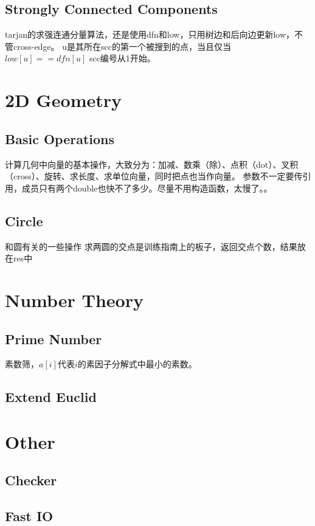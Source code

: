 \documentclass[twoside, UTF8]{article}
\begin{document}
		\subsection{Strongly Connected Components}
			\begin{flushleft}
				tarjan的求强连通分量算法，还是使用dfn和low，只用树边和后向边更新low，不管cross-edge。
				\linebreak u是其所在scc的第一个被搜到的点，当且仅当$low[u] == dfn[u]$
				\linebreak scc编号从1开始。
			\end{flushleft}
			
	\newpage
	\section{2D Geometry}
		\subsection{Basic Operations}
			\begin{flushleft}
				计算几何中向量的基本操作，大致分为：加减、数乘（除）、点积（dot）、叉积（cross）、旋转、求长度、求单位向量，同时把点也当作向量。
				\linebreak 参数不一定要传引用，成员只有两个double也快不了多少。尽量不用构造函数，太慢了。。
			\end{flushleft}
			
		\subsection{Circle}
			\begin{flushleft}
				和圆有关的一些操作
				\linebreak 求两圆的交点是训练指南上的板子，返回交点个数，结果放在res中
			\end{flushleft}
			
	\newpage
	\section{Number Theory}
		\subsection{Prime Number}
			\begin{flushleft}
				素数筛，$a[i]$代表$i$的素因子分解式中最小的素数。
			\end{flushleft}
			
		\subsection{Extend Euclid}
			
	\newpage
	\section{Other}
		\subsection{Checker}
			
		\subsection{Fast IO}
			
\end{document}
